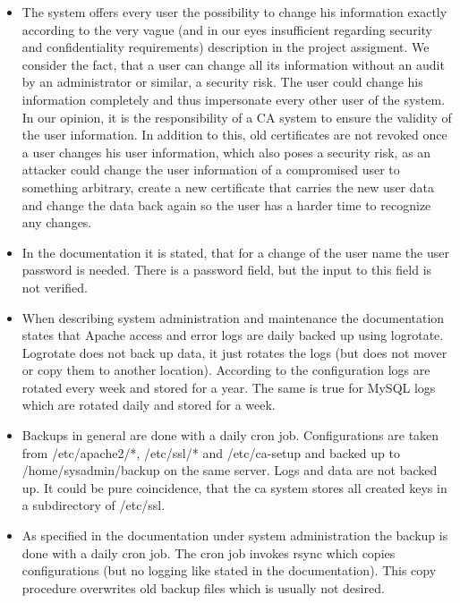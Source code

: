 \documentclass{article}
\begin{document}
\begin{itemize}
\item The system offers every user the possibility to change his information exactly according to the very vague (and in our eyes insufficient regarding security and confidentiality requirements) description in the project assigment. We consider the fact, that a user can change all its information without an audit by an administrator or similar, a security risk. The user could change his information completely and thus impersonate every other user of the system. In our opinion, it is the responsibility of a CA system to ensure the validity of the user information. In addition to this, old certificates are not revoked once a user changes his user information, which also poses a security risk, as an attacker could change the user information of a compromised user to something arbitrary, create a new certificate that carries the new user data and change the data back again so the user has a harder time to recognize any changes.

\item In the documentation it is stated, that for a change of the user name the user password is needed. There is a password field, but the input to this field is not verified.

\item When describing system administration and maintenance the documentation states that Apache access and error logs are daily backed up using logrotate. Logrotate does not back up data, it just rotates the logs (but does not mover or copy them to another location). According to the configuration logs are rotated every week and stored for a year. The same is true for MySQL logs which are rotated daily and stored for a week.

\item Backups in general are done with a daily cron job. Configurations are taken from /etc/apache2/*, /etc/ssl/* and /etc/ca-setup and backed up to /home/sysadmin/backup on the same server. Logs and data are not backed up. It could be pure coincidence, that the ca system stores all created keys in a subdirectory of /etc/ssl.

\item As specified in the documentation under system administration the backup is done with a daily cron job. The cron job invokes rsync which copies configurations (but no logging like stated in the documentation). This copy procedure overwrites old backup files which is usually not desired.


\end{itemize}
\end{document}
